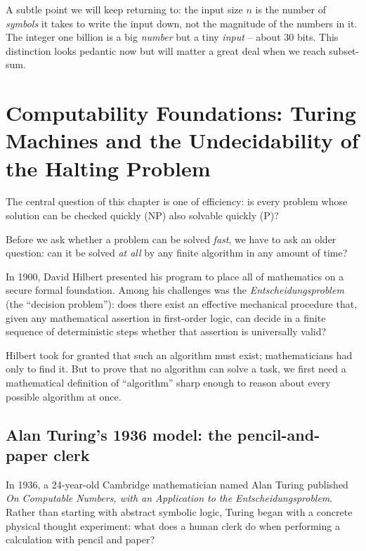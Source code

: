 A subtle point we will keep returning to: the input size $n$ is the number of
\emph{symbols} it takes to write the input down, not the magnitude of the numbers
in it. The integer one billion is a big \emph{number} but a tiny \emph{input} --
about 30 bits. This distinction looks pedantic now but will matter a great deal
when we reach subset-sum.

\section{Computability Foundations: Turing Machines and the Undecidability of the Halting Problem}
\label{ch33:computability}

The central question of this chapter is one of efficiency: is every problem whose solution can be checked quickly ($\mathrm{NP}$) also solvable quickly ($\mathrm{P}$)?

Before we ask whether a problem can be solved \emph{fast}, we have to ask an older question: can it be solved \emph{at all} by any finite algorithm in any amount of time?

In 1900, David Hilbert presented his program to place all of mathematics on a secure formal foundation. Among his challenges was the \emph{Entscheidungsproblem} (the ``decision problem''): does there exist an effective mechanical procedure that, given any mathematical assertion in first-order logic, can decide in a finite sequence of deterministic steps whether that assertion is universally valid?

Hilbert took for granted that such an algorithm must exist; mathematicians had only to find it. But to prove that no algorithm can solve a task, we first need a mathematical definition of ``algorithm'' sharp enough to reason about every possible algorithm at once.

\subsection{Alan Turing's 1936 model: the pencil-and-paper clerk}

In 1936, a 24-year-old Cambridge mathematician named Alan Turing published \emph{On Computable Numbers, with an Application to the Entscheidungsproblem}. Rather than starting with abstract symbolic logic, Turing began with a concrete physical thought experiment: what does a human clerk do when performing a calculation with pencil and paper?

